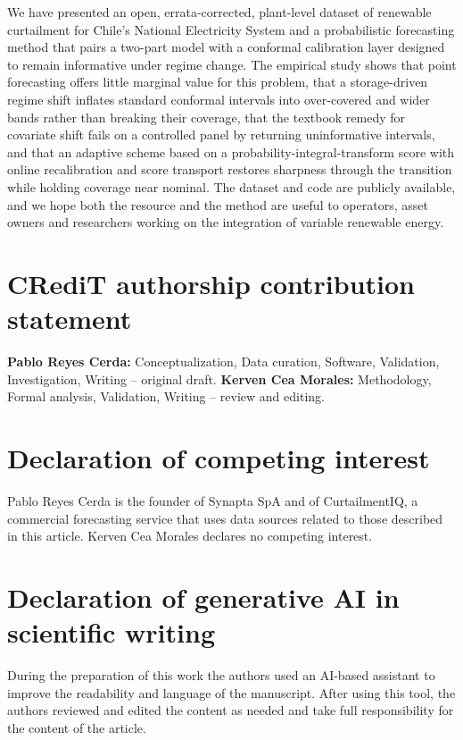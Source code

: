 \documentclass[preprint,3p,times]{elsarticle}
\begin{document}
We have presented an open, errata-corrected, plant-level dataset of renewable curtailment for Chile's National Electricity System and a probabilistic forecasting method that pairs a two-part model with a conformal calibration layer designed to remain informative under regime change. The empirical study shows that point forecasting offers little marginal value for this problem, that a storage-driven regime shift inflates standard conformal intervals into over-covered and wider bands rather than breaking their coverage, that the textbook remedy for covariate shift fails on a controlled panel by returning uninformative intervals, and that an adaptive scheme based on a probability-integral-transform score with online recalibration and score transport restores sharpness through the transition while holding coverage near nominal. The dataset and code are publicly available, and we hope both the resource and the method are useful to operators, asset owners and researchers working on the integration of variable renewable energy.

\section*{CRediT authorship contribution statement}
\textbf{Pablo Reyes Cerda:} Conceptualization, Data curation, Software, Validation, Investigation, Writing -- original draft. \textbf{Kerven Cea Morales:} Methodology, Formal analysis, Validation, Writing -- review and editing.

\section*{Declaration of competing interest}
Pablo Reyes Cerda is the founder of Synapta SpA and of CurtailmentIQ, a commercial forecasting service that uses data sources related to those described in this article. Kerven Cea Morales declares no competing interest.

\section*{Declaration of generative AI in scientific writing}
During the preparation of this work the authors used an AI-based assistant to improve the readability and language of the manuscript. After using this tool, the authors reviewed and edited the content as needed and take full responsibility for the content of the article.
\end{document}
